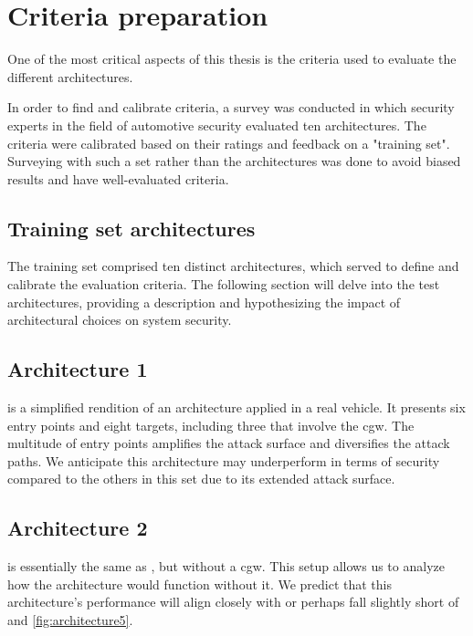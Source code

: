 \chapter{Criteria preparation}
\label{chp:introcriteria}

One of the most critical aspects of this thesis is the criteria used to evaluate the different architectures.

In order to find and calibrate criteria, a survey was conducted in which security experts in the field of automotive security evaluated ten architectures.
The criteria were calibrated based on their ratings and feedback on a "training set".
Surveying with such a set rather than the architectures was done to avoid biased results and have well-evaluated criteria.

\section{Training set architectures}
\label{sec:trainingarch}

The training set comprised ten distinct architectures, which served to define and calibrate the evaluation criteria. 
The following section will delve into the test architectures, 
providing a description and hypothesizing the impact of architectural choices on system security.

\section{Architecture 1}
\label{subsec:arch1}

 is a simplified rendition of an architecture applied in a real vehicle. 
It presents six entry points and eight targets, including three that involve the \acrshort{cgw}. 
The multitude of entry points amplifies the attack surface and diversifies the attack paths. 
We anticipate this architecture may underperform in terms of security compared to the others in this set due to its extended attack surface.

\section{Architecture 2}
\label{subsec:arch2}

 is essentially the same as , 
but without a \acrshort{cgw}.
This setup allows us to analyze how the architecture would function without it. 
We predict that this architecture's performance will align closely with or perhaps 
fall slightly short of  and \ref{fig:architecture5}.

